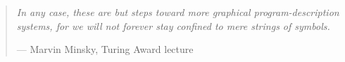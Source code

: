 \documentclass[preprint,9pt]{sigplanconf}
\begin{document}
\begin{quote}
\emph{In any case, these are but steps toward more graphical program-description
systems, for we will not forever stay confined to mere strings of symbols.}

--- Marvin Minsky, Turing Award lecture \cite{DBLP:journals/jacm/Minsky70}
\end{quote}

\acks


\clearpage




\iftr
\clearpage
\appendix

\else
\fi
\end{document}
